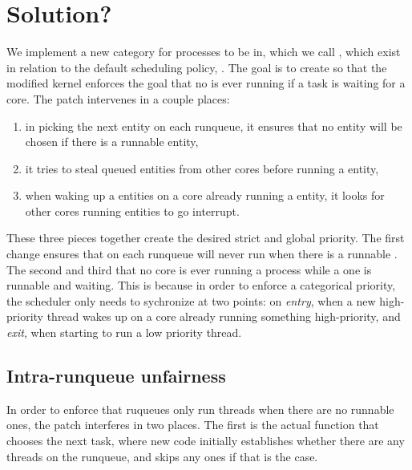 \section{Solution?}\label{s:maybe-solution}

We implement a new category for processes to be in, which we call \schedbe{},
which exist in relation to the default scheduling policy, \schednormal{}. The
goal is to create \schedbe{} so that the modified kernel enforces the goal that
no \schedbe{} is ever running if a \schednormal{} task is waiting for a core.
The patch intervenes in a couple places:
\begin{enumerate}
    \item in picking the next entity on each runqueue, it ensures that no
\schedbe{} entity will be chosen if there is a runnable \schednormal{} entity,
    \item it tries to steal queued \schednormal{} entities from other cores
before running a \schedbe{} entity,
    \item when waking up a \schednormal{} entities on a core already running a
    \schednormal{} entity, it looks for other cores running \schedbe{}
    entities to go interrupt.
\end{enumerate}

These three pieces together create the desired strict and global priority. The
first change ensures that on each runqueue \schedbe{} will never run when there
is a runnable \schednormal{}. The second and third that no core is ever running
a \schedbe{} process while a \schednormal{} one is runnable and waiting. This is
because in order to enforce a categorical priority, the scheduler only needs to
sychronize at two points: on \textit{entry}, when a new high-priority thread
wakes up on a core already running something high-priority, and \textit{exit},
when starting to run a low priority thread.

\subsection{Intra-runqueue unfairness}

In order to enforce that ruqueues only run \schedbe{} threads when there are no
runnable \schednormal{} ones, the patch interferes in two places. The first is
the actual function that chooses the next task, where new code initially
establishes whether there are any \schednormal{} threads on the runqueue, and
skips any \schedbe{} ones if that is the case. 

